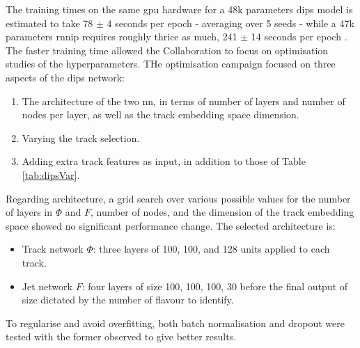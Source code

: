 The training times on the same \gls{gpu} hardware for a 48k parameters \gls{dips} model is estimated to take 78 $\pm$ 4 seconds per epoch - averaging over 5 seeds - while a 47k parameters \gls{rnnip} requires roughly thrice as much, 241 $\pm$ 14 seconds per epoch \cite{ATL-PHYS-PUB-2020-014}. The faster training time allowed the Collaboration to focus on optimisation studies of the hyperparameters. THe optimisation campaign focused on three aspects of the \gls{dips} network:
\begin{enumerate}
  \item The architecture of the two \gls{nn}, in terms of number of layers and number of nodes per layer, as well as the track embedding space dimension.
  \item Varying the track selection.
  \item Adding extra track features as input, in addition to those of Table \ref{tab:dipsVar}.
\end{enumerate}

Regarding architecture, a grid search over various possible values for the number of layers in $\Phi$ and $F$, number of nodes, and the dimension of the track embedding space showed no significant performance change. The selected architecture is:
\begin{itemize}
  \item Track network $\Phi$: three layers of 100, 100, and 128 units applied to each track. 
  \item Jet network $F$: four layers of size 100, 100, 100, 30 before the final output of size dictated by the number of flavour to identify. 
\end{itemize}
To regularise and avoid overfitting, both batch normalisation and dropout were tested with the former observed to give better results. \\ 

